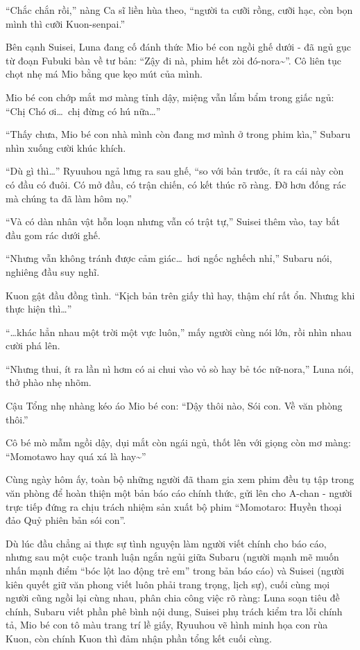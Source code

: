 \documentclass[../main.tex]{subfiles}
\begin{document}
``Chắc chắn rồi,'' nàng Ca sĩ liền hùa theo, ``người ta cưỡi rồng, cưỡi hạc, còn bọn mình thì cưỡi Kuon-senpai.''

Bên cạnh Suisei, Luna đang cố đánh thức Mio bé con ngồi ghế dưới -  đã ngủ gục từ đoạn Fubuki bàn về tư bản: ``Zậy đi nà, phim hết zòi đó-nora\~{}''. Cô liên tục chọt nhẹ má Mio bằng que kẹo mút của mình.

Mio bé con chớp mắt mơ màng tỉnh dậy, miệng vẫn lẩm bẩm trong giấc ngủ: ``Chị Chó ơi\dots\ chị đừng có hú nữa\dots''

``Thấy chưa, Mio bé con nhà mình còn đang mơ mình ở trong phim kìa,'' Subaru nhìn xuống cười khúc khích.

``Dù gì thì\dots'' Ryuuhou ngả lưng ra sau ghế, ``so với bản trước, ít ra cái này còn có đầu có đuôi. Có mở đầu, có trận chiến, có kết thúc rõ ràng. Đỡ hơn đống rác mà chúng ta đã làm hôm nọ.''

``Và có dàn nhân vật hỗn loạn nhưng vẫn có trật tự,'' Suisei thêm vào, tay bắt đầu gom rác dưới ghế.

``Nhưng vẫn không tránh được cảm giác\dots\ hơi ngốc nghếch nhỉ,'' Subaru nói, nghiêng đầu suy nghĩ.

Kuon gật đầu đồng tình. ``Kịch bản trên giấy thì hay, thậm chí rất ổn. Nhưng khi thực hiện thì\dots''

``\dots khác hẳn nhau một trời một vực luôn,'' mấy người cùng nói lớn, rồi nhìn nhau cười phá lên.

``Nhưng thui, ít ra lần nì hơm có ai chui vào vỏ sò hay bẻ tóc nữ-nora,'' Luna nói, thở phào nhẹ nhõm.

Cậu Tổng nhẹ nhàng kéo áo Mio bé con: ``Dậy thôi nào, Sói con. Về văn phòng thôi.''

Cô bé mò mẫm ngồi dậy, dụi mắt còn ngái ngủ, thốt lên với giọng còn mơ màng: ``Momotawo hay quá xá là hay\~{}''

\ct

Cùng ngày hôm ấy, toàn bộ những người đã tham gia xem phim đều tụ tập trong văn phòng để hoàn thiện một bản báo cáo chính thức, gửi lên cho A-chan - người trực tiếp đứng ra chịu trách nhiệm sản xuất bộ phim ``Momotaro: Huyền thoại đảo Quỷ phiên bản sói con''.

Dù lúc đầu chẳng ai thực sự tình nguyện làm người viết chính cho báo cáo, nhưng sau một cuộc tranh luận ngắn ngủi giữa Subaru (người mạnh mẽ muốn nhấn mạnh điểm ``bóc lột lao động trẻ em'' trong bản báo cáo) và Suisei (người kiên quyết giữ văn phong viết luôn phải trang trọng, lịch sự), cuối cùng mọi người cũng ngồi lại cùng nhau, phân chia công việc rõ ràng: Luna soạn tiêu đề chính, Subaru viết phần phê bình nội dung, Suisei phụ trách kiểm tra lỗi chính tả, Mio bé con tô màu trang trí lề giấy, Ryuuhou vẽ hình minh họa con rùa Kuon, còn chính Kuon thì đảm nhận phần tổng kết cuối cùng.
\end{document}

